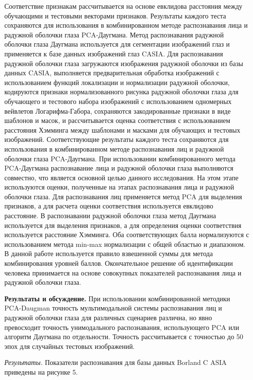 Соответствие признакам рассчитывается на основе евклидова расстояния
между обучающими и тестовыми векторами признаков. Результаты каждого
теста сохраняются для использования в комбинированном методе
распознавания лица и радужной оболочки глаза PCA-Даугмана. Метод
распознавания радужной оболочки глаза Даугмана используется для
сегментации изображений глаз и применяется к базе данных изображений
глаз CASIA. Для распознавания радужной оболочки глаза загружаются
изображения радужной оболочки из базы данных CASIA, выполняется
предварительная обработка изображений с использованием функций
локализации и нормализации радужной оболочки, кодируются признаки
нормализованного рисунка радужной оболочки глаза для обучающего и
тестового набора изображений с использованием одномерных вейвлетов
Логарифма-Габора, сохраняются закодированные признаки в виде шаблонов и
масок, и рассчитывается оценка соответствия с использованием расстояния
Хэмминга между шаблонами и масками для обучающих и тестовых изображений.
Соответствующие результаты каждого теста сохраняются для использования в
комбинированном методе распознавания лиц и радужной оболочки глаза
PCA-Даугмана. При использовании комбинированного метода PCA-Даугмана
распознавание лица и радужной оболочки глаза выполняются совместно, что
является основной целью данного исследования. На этом этапе используются
оценки, полученные на этапах распознавания лица и радужной оболочки
глаза. Для распознавания лиц применяется метод PCA для выделения
признаков, а для расчета оценки соответствия используется евклидово
расстояние. В распознавании радужной оболочки глаза метод Даугмана
используется для выделения признаков, а для определения оценки
соответствия используется расстояние Хэмминга. Оба соответствующих балла
нормализуются с использованием метода min-max нормализации с общей
областью и диапазоном. В данной работе используется правило взвешенной
суммы для метода комбинирования уровней баллов. Окончательное решение об
идентификации человека принимается на основе совокупных показателей
распознавания лица и радужной оболочки глаза.

\textbf{Результаты и обсуждение.} При использовании комбинированной
методики PCA-Daugman точность мультимодальной системы распознавания лиц
и радужной оболочки глаза для различных сценариев различна, но явно
превосходит точность унимодального распознавания, использующего PCA или
алгоритм Даугмана по отдельности. Точность рассчитывается с точностью до
50 эпох для случайных тестовых изображений.

\emph{Результаты.} Показатели распознавания для базы данных Borland C
ASIA приведены на рисунке 5.

